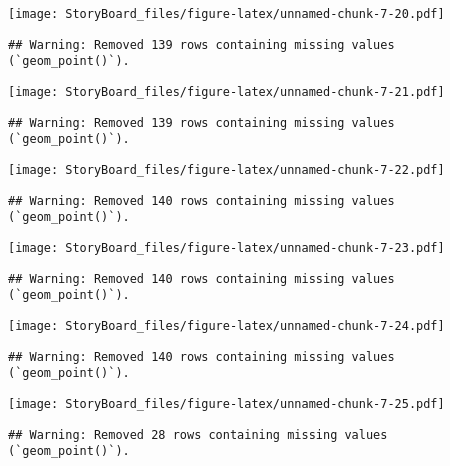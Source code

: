 \documentclass[
]{article}
\begin{document}
\texttt{[image: StoryBoard\_files/figure-latex/unnamed-chunk-7-20.pdf]}

\begin{verbatim}
## Warning: Removed 139 rows containing missing values (`geom_point()`).
\end{verbatim}

\texttt{[image: StoryBoard\_files/figure-latex/unnamed-chunk-7-21.pdf]}

\begin{verbatim}
## Warning: Removed 139 rows containing missing values (`geom_point()`).
\end{verbatim}

\texttt{[image: StoryBoard\_files/figure-latex/unnamed-chunk-7-22.pdf]}

\begin{verbatim}
## Warning: Removed 140 rows containing missing values (`geom_point()`).
\end{verbatim}

\texttt{[image: StoryBoard\_files/figure-latex/unnamed-chunk-7-23.pdf]}

\begin{verbatim}
## Warning: Removed 140 rows containing missing values (`geom_point()`).
\end{verbatim}

\texttt{[image: StoryBoard\_files/figure-latex/unnamed-chunk-7-24.pdf]}

\begin{verbatim}
## Warning: Removed 140 rows containing missing values (`geom_point()`).
\end{verbatim}

\texttt{[image: StoryBoard\_files/figure-latex/unnamed-chunk-7-25.pdf]}

\begin{verbatim}
## Warning: Removed 28 rows containing missing values (`geom_point()`).
\end{verbatim}
\end{document}
